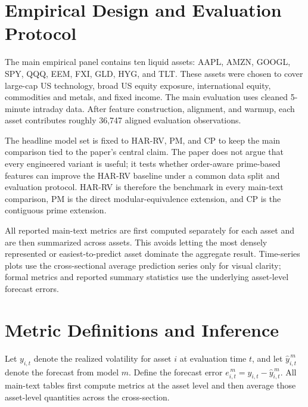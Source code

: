 ﻿\documentclass[11pt,a4paper]{article}
\begin{document}
\section{Empirical Design and Evaluation Protocol}

\noindent
The main empirical panel contains ten liquid assets: AAPL, AMZN, GOOGL, SPY, QQQ, EEM, FXI, GLD, HYG, and TLT. These assets were chosen to cover large-cap US technology, broad US equity exposure, international equity, commodities and metals, and fixed income. The main evaluation uses cleaned 5-minute intraday data. After feature construction, alignment, and warmup, each asset contributes roughly 36,747 aligned evaluation observations.

\noindent
The headline model set is fixed to HAR-RV, PM, and CP to keep the main comparison tied to the paper's central claim. The paper does not argue that every engineered variant is useful; it tests whether order-aware prime-based features can improve the HAR-RV baseline under a common data split and evaluation protocol. HAR-RV is therefore the benchmark in every main-text comparison, PM is the direct modular-equivalence extension, and CP is the contiguous prime extension.

\noindent
All reported main-text metrics are first computed separately for each asset and are then summarized across assets. This avoids letting the most densely represented or easiest-to-predict asset dominate the aggregate result. Time-series plots use the cross-sectional average prediction series only for visual clarity; formal metrics and reported summary statistics use the underlying asset-level forecast errors.

\section{Metric Definitions and Inference}

\noindent
Let $y_{i,t}$ denote the realized volatility for asset $i$ at evaluation time $t$, and let $\hat{y}^{\,m}_{i,t}$ denote the forecast from model $m$. Define the forecast error $e^{\,m}_{i,t} = y_{i,t} - \hat{y}^{\,m}_{i,t}$. All main-text tables first compute metrics at the asset level and then average those asset-level quantities across the cross-section.
\end{document}
